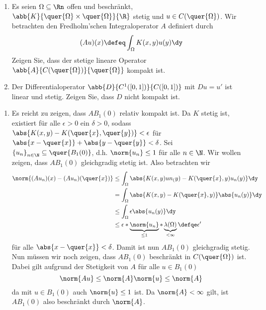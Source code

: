 \begin{exercisePage}
	
\setcounter{taskcount}{18}

\begin{exercise}
	\begin{enumerate}
		\item Es seien $\Omega \subseteq \Rn$ offen und beschränkt, $\abb{K}{\quer{\Omega} \times \quer{\Omega}}{\R}$ stetig und $u \in C(\quer{\Omega})$. Wir betrachten den Fredholm'schen Integraloperator $A$ definiert durch 
		\begin{equation*}
			(Au)(x) \defeq \int_\Omega K(x,y) u(y) \dy
		\end{equation*}
		Zeigen Sie, dass der stetige lineare Operator $\abb{A}{C(\quer{\Omega})}{\quer{\Omega}}$ kompakt ist.
		\item Der Differentialoperator $\abb{D}{C^1([0,1])}{C([0,1])}$ mit $Du = u'$ ist linear und stetig. Zeigen Sie, dass $D$ nicht kompakt ist.
	\end{enumerate}
\end{exercise}

\begin{enumerate}[label=(zu \alph*), leftmargin=\zulength]
	\item Es reicht zu zeigen, dass $A B_1(0)$ relativ kompakt ist. Da $K$ stetig ist, existiert für alle $\epsilon > 0$ ein $\delta > 0$, sodass $\abs{K(x,y) - K(\quer{x}, \quer{y})} < \epsilon$ für $\abs{x-\quer{x}} + \abs{y - \quer{y}} < \delta$. Sei $\folge{u_n}{n \in \N} \subseteq \quer{B_1(0)}$, d.h. $\norm{u_n} \le 1$ für alle $n \in \N$. Wir wollen zeigen, dass $A B_1(0)$ gleichgradig stetig ist. Also betrachten wir
	\begin{align*}
		\norm{(Au_n)(x) - (Au_n)(\quer{x})} &\le \int_\Omega \abs{K(x,y) un_(y) - K(\quer{x}, y) u_n(y)} \dy \\
		&= \int_\Omega \abs{K(x,y) - K(\quer{x},y)} \abs{u_n(y)} \dy \\
		&\le \int_\Omega \epsilon \abs{u_n(y)} \dy \\
		&\le \epsilon * \underbrace{\norm{u_n}}_{\le 1} * \underbrace{\lambda(\Omega)}_{< \infty} \defqe \epsilon'		
	\end{align*}
	für alle $\abs{x-\quer{x}} < \delta$. Damit ist nun $A B_1(0)$ gleichgradig stetig. Nun müssen wir noch zeigen, dass $A B_1(0)$ beschränkt in $C(\quer{\Omega})$ ist. Dabei gilt aufgrund der Stetigkeit von $A$ für alle $u \in B_1(0)$
	\begin{equation*}
		\norm{Au} \le \norm{A} \norm{u} \le \norm{A}
	\end{equation*}
	da mit $u \in B_1(0)$ auch $\norm{u} \le 1$ ist. Da $\norm{A} < \infty$ gilt, ist $A B_1(0)$ also beschränkt durch $\norm{A}$.
	

\end{enumerate}
\end{exercisePage}

